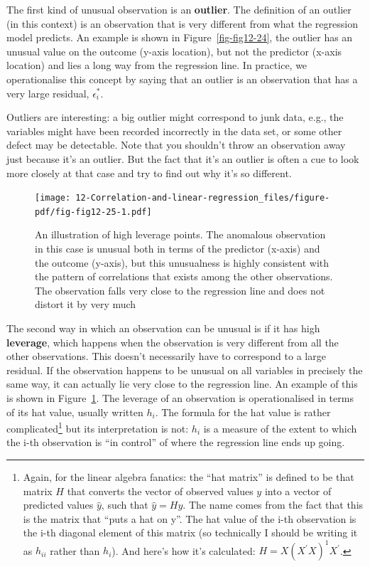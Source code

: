 \documentclass[
  a4paper,
]{book}
\begin{document}
The first kind of unusual observation is an \textbf{outlier}. The
definition of an outlier (in this context) is an observation that is
very different from what the regression model predicts. An example is
shown in Figure~\ref{fig-fig12-24}, the outlier has an unusual value on
the outcome (y-axis location), but not the predictor (x-axis location)
and lies a long way from the regression line. In practice, we
operationalise this concept by saying that an outlier is an observation
that has a very large residual, \(\epsilon_i^*\).

Outliers are interesting: a big outlier might correspond to junk data,
e.g., the variables might have been recorded incorrectly in the data
set, or some other defect may be detectable. Note that you shouldn't
throw an observation away just because it's an outlier. But the fact
that it's an outlier is often a cue to look more closely at that case
and try to find out why it's so different.

\begin{figure}[h!]

\texttt{[image: 12-Correlation-and-linear-regression\_files/figure-pdf/fig-fig12-25-1.pdf]} \hfill{}

\caption{\label{fig-fig12-25}An illustration of high leverage points.
The anomalous observation in this case is unusual both in terms of the
predictor (x-axis) and the outcome (y-axis), but this unusualness is
highly consistent with the pattern of correlations that exists among the
other observations. The observation falls very close to the regression
line and does not distort it by very much}

\end{figure}

The second way in which an observation can be unusual is if it has high
\textbf{leverage}, which happens when the observation is very different
from all the other observations. This doesn't necessarily have to
correspond to a large residual. If the observation happens to be unusual
on all variables in precisely the same way, it can actually lie very
close to the regression line. An example of this is shown in
Figure~\ref{fig-fig12-25}. The leverage of an observation is
operationalised in terms of its hat value, usually written \(h_i\). The
formula for the hat value is rather complicated\footnote{Again, for the
  linear algebra fanatics: the ``hat matrix'' is defined to be that
  matrix \(H\) that converts the vector of observed values \(y\) into a
  vector of predicted values \(\hat{y}\), such that \(\hat{y} = Hy\).
  The name comes from the fact that this is the matrix that ``puts a hat
  on y''. The hat value of the i-th observation is the i-th diagonal
  element of this matrix (so technically I should be writing it as
  \(h_{ii}\) rather than \(h_i\)). And here's how it's calculated:
  \(H = X(X^{'}X)^{1}X^{'}\).} but its interpretation is not: \(h_i\) is
a measure of the extent to which the i-th observation is ``in control''
of where the regression line ends up going.
\end{document}
